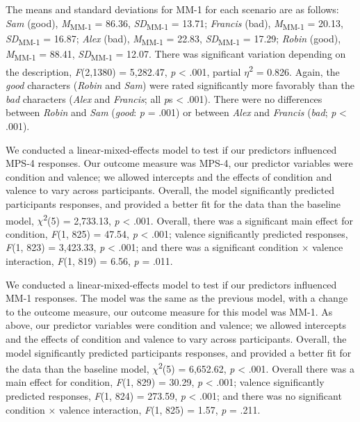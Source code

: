 \documentclass[
  man,floatsintext]{apa7}
\begin{document}
The means and standard deviations for MM-1 for each scenario are as follows:
\emph{Sam} (good),
\emph{M}\textsubscript{MM-1} = 86.36, \emph{SD}\textsubscript{MM-1} = 13.71;
\emph{Francis} (bad),
\emph{M}\textsubscript{MM-1} = 20.13, \emph{SD}\textsubscript{MM-1} = 16.87;
\emph{Alex} (bad),
\emph{M}\textsubscript{MM-1} = 22.83, \emph{SD}\textsubscript{MM-1} = 17.29;
\emph{Robin} (good),
\emph{M}\textsubscript{MM-1} = 88.41, \emph{SD}\textsubscript{MM-1} = 12.07. There was significant variation depending on the description, \emph{F}(2,1380) = 5,282.47, \emph{p} \textless{} .001, partial \(\eta\)\textsuperscript{2} = 0.826. Again, the \emph{good} characters (\emph{Robin} and \emph{Sam}) were rated significantly more favorably than the \emph{bad} characters (\emph{Alex} and \emph{Francis}; all \emph{p}s \textless{} .001). There were no differences between \emph{Robin} and \emph{Sam} (\emph{good}: \emph{p} = .001) or between \emph{Alex} and \emph{Francis} (\emph{bad}; \emph{p} \textless{} .001).

We conducted a linear-mixed-effects model to test if our predictors influenced MPS-4 responses. Our outcome measure was MPS-4, our predictor variables were condition and valence; we allowed intercepts and the effects of condition and valence to vary across participants.
Overall, the model significantly predicted participants responses, and provided a better fit for the data than the baseline model,
\(\chi\)\textsuperscript{2}(5) = 2,733.13, \emph{p} \textless{} .001.
Overall, there was a significant main effect for condition,
\emph{F}(1, 825) = 47.54, \emph{p} \textless{} .001;
valence significantly predicted responses,
\emph{F}(1, 823) = 3,423.33, \emph{p} \textless{} .001;
and there was a significant condition \(\times\) valence interaction,
\emph{F}(1, 819) = 6.56, \emph{p} = .011.

We conducted a linear-mixed-effects model to test if our predictors influenced MM-1 responses. The model was the same as the previous model, with a change to the outcome measure, our outcome measure for this model was MM-1. As above, our predictor variables were condition and valence; we allowed intercepts and the effects of condition and valence to vary across participants.
Overall, the model significantly predicted participants responses, and provided a better fit for the data than the baseline model,
\(\chi\)\textsuperscript{2}(5) = 6,652.62, \emph{p} \textless{} .001.
Overall there was a main effect for condition,
\emph{F}(1, 829) = 30.29, \emph{p} \textless{} .001;
valence significantly predicted responses,
\emph{F}(1, 824) = 273.59, \emph{p} \textless{} .001;
and there was no significant condition \(\times\) valence interaction,
\emph{F}(1, 825) = 1.57, \emph{p} = .211.
\end{document}
